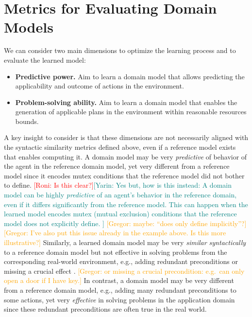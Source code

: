 \documentclass{article}
\theoremstyle{definition}
\theoremstyle{remark}
\newcommand{\roni}[1]{{\textcolor{red}{[Roni: #1]}}}
\newcommand{\mauro}[1]{{\textcolor{green}{[Mauro: #1]}}}
\newcommand{\yarin}[1]{{\textcolor{teal}{[Yarin: #1]}}}
\newcommand{\gregor}[1]{{\textcolor{orange}{[Gregor: #1]}}}
\begin{document}
\section{Metrics for Evaluating Domain Models}

We can consider two main dimensions to optimize the learning process and to evaluate the learned model:
%
\begin{itemize}
    \item \textbf{Predictive power.} Aim to learn a domain model that allows predicting the applicability and outcome of actions in the environment. 
    \item \textbf{Problem-solving ability.} Aim to learn a domain model that enables the generation of applicable plans in the environment within reasonable resources bounds. %
\end{itemize}


A key insight to consider 
is that these dimensions are not necessarily aligned with the syntactic similarity metrics defined above, even if a reference model exists that enables computing it.  
A domain model may be very \emph{predictive} of 
behavior of the agent in the reference domain model, yet very different from a reference model since it encodes mutex conditions that the reference model did not bother to define. \roni{Is this clear?}\yarin{Yes but, how is this instead: A domain model can be highly \emph{predictive} of an agent's behavior in the reference domain, even if it differs significantly from the reference model. This can happen when the learned model encodes mutex (mutual exclusion) conditions that the reference model does not explicitly define.
}
\gregor{maybe: ``does only define implicitly''?} \gregor{I've also put this issue already in the example above. Is this more illustrative?}
Similarly, a learned domain model may be very \emph{similar syntactically} to a reference domain model but not effective in solving problems from the corresponding real-world environment, 
e.g., adding redundant preconditions or missing a crucial effect \citep{DBLP:conf/kcap/VallatiC19}. \gregor{or missing a crucial precondition: e.g.\ can only open a door if I have key.}
In contrast, a domain model may be very different from a reference domain model, e.g., adding many redundant preconditions to some actions, yet very \emph{effective} in solving problems in the application domain since these redundant preconditions are often true in the real world. 
\end{document}
